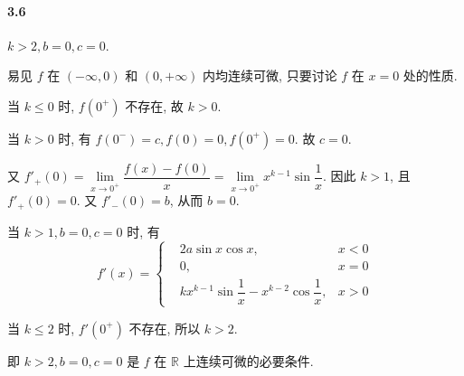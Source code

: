 \paragraph*{3.6} $k>2,b=0,c=0$. 

易见 $f$ 在 $(-\infty, 0)$ 和 $(0, +\infty)$ 内均连续可微, 只要讨论 $f$ 在 $x = 0$ 处的性质.

当 $k\leq 0$ 时, $f\left(0^{+}\right)$ 不存在, 故 $k > 0$.

当 $k>0$ 时, 有 $f\left(0^{-}\right) = c, f(0) = 0, f\left(0^{+}\right) = 0$. 故 $c = 0$.

又 $f'_+(0) = \lim\limits_{x\to 0^{+}} \dfrac{f(x) - f(0)}{x} = \lim\limits_{x\to 0^{+}} x^{k-1}\sin\dfrac{1}{x}$. 因此 $k>1$, 且 $f'_+(0) = 0$. 又 $f'_-(0) = b$, 从而 $b = 0$.

当 $k > 1, b = 0, c = 0$ 时, 有
\[
	f'(x) = 
	\left\{
\begin{aligned}
&2a\sin x\cos x,& x < 0\\
&0,& x = 0\\
&kx^{k-1}\sin\dfrac{1}{x}-x^{k-2}\cos \dfrac{1}{x},&x>0
\end{aligned}
	\right.
\]

当 $k\leq 2$ 时, $f'\left(0^{+}\right)$ 不存在, 所以 $k>2$.

即 $k>2,b=0,c=0$ 是 $f$ 在 $\mathbb{R}$ 上连续可微的必要条件.